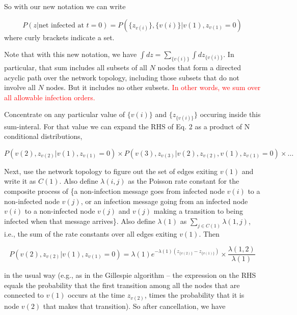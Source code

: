 \documentclass{article}
\begin{document}
	So with our new notation we can write

	\begin{equation}
	 P(z | \text{net infected at } t = 0) = P(\{z_{v(i)}\}, \{v(i)\} | v(1), z_{v(1)} = 0)
	\end{equation}
	where curly brackets indicate a set. 

	Note that with this new notation, we have $\int dz = \sum_{\{v(i)\}} \int dz_{\{v(i)\}}$.
	In particular, that sum includes all subsets of all $N$ nodes that form a directed 
        acyclic path over the network topology, including those subsets that do not involve all $N$
	nodes. But it includes no other subsets.  \textcolor{red}{In other words, we sum over all allowable infection 
        orders.}

	Concentrate on any particular value of $\{v(i)\}$ and $\{z_{\{v(i)\}}\}$ occuring
	inside this sum-interal. For that value we can expand the RHS of Eq. 2
	as a product of N conditional distributions,

	\begin{equation*}
		P(v(2), z_{v(2)} |  v(1), z_{v(1)} = 0)    \times  
		P(v(3), z_{v(3)} |  v(2), z_{v(2)}, v(1), z_{v(1)} = 0)    \times  \ldots
	\end{equation*}

	Next, use the network topology to figure out the set of edges exiting
	$v(1)$ and write it as $C(1)$. Also define $\lambda(i,j)$ as the Poisson rate
	constant for the composite process of \{a non-infection message goes
	from infected node $v(i)$ to a non-infected node $v(j)$, or an infection
	message going from an infected node $v(i)$ to a non-infected node $v(j)$
	and $v(j)$ making a transition to being infected when that message
	arrives\}.  Also define $\lambda(1)$ as $\sum_{j \in C(1)} \lambda(1,j)$,
	i.e., the sum of the rate constants over all edges exiting $v(1)$. Then

	\begin{equation*}
		P(v(2), z_{v(2)} | v(1), z_{v(1)} = 0)  =
		\lambda(1) e^{- \lambda(1) (z_{\{v(2)\}} - z_{\{v(1)\}})} 
		\times \frac{\lambda(1,2)}{\lambda(1)}
	\end{equation*}

	in the usual way (e.g., as in the Gillespie algorithm -- the
	expression on the RHS equals the probability that the first transition
	among all the nodes that are connected to $v(1)$ occurs at the time
	$z_{v(2)}$, times the probability that it is node $v(2)$ that makes that
	transition). So after cancellation, we have
	
\end{document}
